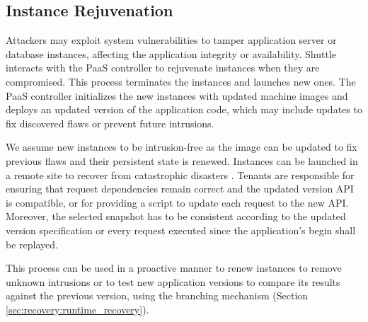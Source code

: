 


\subsection{Instance Rejuvenation}
\label{sec:recovery:instance_rejuventaion}
Attackers may exploit system vulnerabilities to tamper application server or database instances, affecting the application integrity or availability. Shuttle interacts with the \ac{PaaS} controller to rejuvenate instances when they are compromised. This process terminates the instances and launches new ones. The PaaS controller initializes the new instances with updated machine images and deploys an updated version of the application code, which may include updates to fix discovered flaws or prevent future intrusions.

We assume new instances to be intrusion-free as the image can be updated to fix previous flaws and their persistent state is renewed. Instances can be launched in a remote site to recover from catastrophic disasters \cite{cloud-disaster}. Tenants are responsible for ensuring that request dependencies remain correct and the updated version API is compatible, or for providing a script to update each request to the new API. Moreover, the selected snapshot has to be consistent according to the updated version specification or every request executed since the application's begin shall be replayed.

This process can be used in a proactive manner to renew instances to remove unknown intrusions \cite{Sousa2010} or to test new application versions to compare its results against the previous version, using the branching mechanism (Section \ref{sec:recovery:runtime_recovery}).


